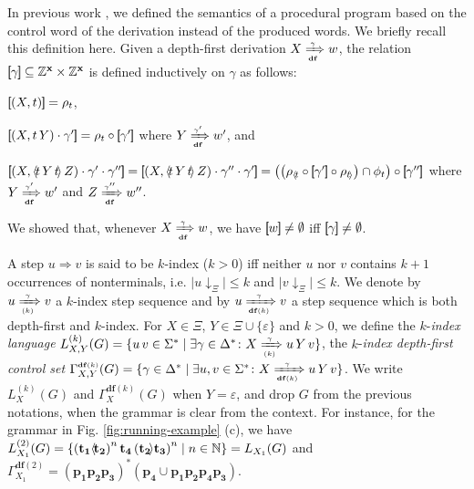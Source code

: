 \documentclass[final]{llncs}
\newcommand{\rbr}{{\bf ]\!\!]}}
\newcommand{\lbr}{{\bf [\!\![}}
\newcommand{\sem}[1]{\lbr #1 \rbr}
\renewcommand{\vec}[1]{{\bf {#1}}}
\newcommand{\xArrow}[2]{\xRightarrow[{\scriptscriptstyle #2}]{{\scriptscriptstyle #1}}}
\newcommand{\nat}{{\bf \mathbb{N}}}
\def\set#1{{\left\{ #1 \right\}}}
\def\zed{\mathbb{Z}}
\def\len#1{{\vert{#1}\vert}}
\def\prod{\Delta}
\def\df#1{\scriptscriptstyle\mathbf{df}(#1)}
\def\Vars{\ensuremath{\Xi}}
\renewcommand{\vec}[1]{{\mathbf {#1}}}
\def\proj{\mathbin{\downarrow}}
\renewcommand{\proj}[2]{{#1}\mathclose{\downarrow}_{{#2}}}
\begin{document}
In previous work \cite{gik13}, we defined the semantics of a
procedural program based on the control word of the derivation instead of the produced words. We briefly
recall this definition here. Given a depth-first
derivation \(X \xArrow{\gamma}{\mathbf{df}} w\), the
relation \(\sem{\gamma} \subseteq \zed^{\vec{x}} \times \zed^{\vec{x}}\)
is defined inductively on \(\gamma\) as follows:
\begin{inparaenum}
\item \(\sem{(X,t)} = \rho_t\),
\item \(\sem{(X,t\, Y) \cdot \gamma'} = \rho_t \circ \sem{\gamma'}\) where
       \(Y \xArrow{\gamma'}{\mathbf{df}} w'\), and
\item \(\sem{(X,\langle\!t \, Y \, t\!\rangle \, Z) \cdot \gamma' \cdot \gamma''} = 
      \sem{(X,\langle\!t \, Y \, t\!\rangle \, Z) \cdot \gamma'' \cdot \gamma'} = 
      \left(\left(\rho_{\langle\! t} \circ \sem{\gamma'} \circ \rho_{t\!\rangle}\right) 
      \cap \phi_t\right) \circ \sem{\gamma''}\) where \(Y \xArrow{\gamma'}{\mathbf{df}} w'\)
      and \(Z \xArrow{\gamma''}{\mathbf{df}} w''\).
\end{inparaenum}
We showed \cite[Lemma 2]{gik13}
that, whenever \(X \xArrow{\gamma}{\mathbf{df}} w\), we have \(\sem{w}\neq\emptyset\) if{}f \(\sem{\gamma}\neq\emptyset\).


A step \(u \Rightarrow v\) is
said to be \(k\)-index (\(k>0\)) if{}f 
neither \(u\) nor \(v\) contains \(k+1\) occurrences of nonterminals, i.e.
\( \len{\proj{u}{\Vars}} \leq k\) and \( \len{\proj{v}{\Vars}} \leq k\).
We denote by \(u \xArrow{\gamma}{(k)} v\)
a \(k\)-index step sequence and by
\(u \xArrow{\gamma}{\df{k}} v\) a step
sequence which is both depth-first and \(k\)-index.
For $X \in \Vars$, $Y \in \Vars \cup \{\varepsilon\}$ and \(k>0\), we
define the \(k\)-\emph{index language} \(L^{(k)}_{X,Y}(G) = \{u\,
v\in\Sigma^* \mid \exists \gamma\in\prod^* \colon
X \xArrow{\gamma}{(k)} u \, Y \, v\}\), the \(k\)-\emph{index
depth-first control set} \(\Gamma_{X,Y}^{\df{k}}(G)
= \{\gamma\in\prod^* \mid \exists u,v \in \Sigma^* \colon
X \xArrow{\gamma}{\df{k}} u\, Y\, v\}\). We write \(L^{(k)}_X(G)\)
and \(\Gamma_X^{\df{k}}(G)\) when \(Y=\varepsilon\), and drop \(G\) from
the previous notations, when the grammar is clear from the
context. For instance, for the grammar in
Fig. \ref{fig:running-example} (c), we have $L_{X_1}^{(2)}(G) =
\set{\left(\mathbf{t_1}\langle\!\mathbf{t_2}\right)^n \mathbf{t_4}
\left(\mathbf{t_2}\!\rangle\mathbf{t_3}\right)^n \mid n \in \nat} = L_{X_1}(G)$ 
and $\Gamma_{X_1}^{\df{2}}
= \left(\mathbf{p_1}\mathbf{p_2}\mathbf{p_3}\right)^*
\left(\mathbf{p_4} \cup \mathbf{p_1}\mathbf{p_2}\mathbf{p_4}\mathbf{p_3}\right)$.
\smallskip
\end{document}

